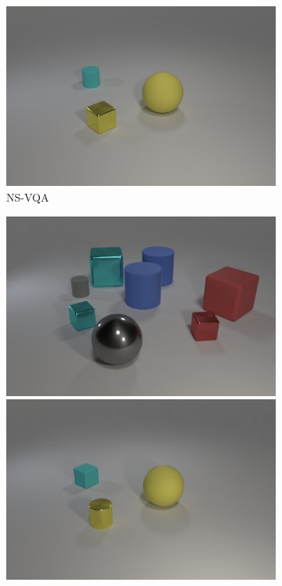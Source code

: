 \begin{figure}[t]
\begin{subfigure}{.32915\linewidth}
\includegraphics[width=\linewidth]{figures/clevr/ns-vqa/1.jpg}
\caption{NS-VQA}
\end{subfigure}
\hfill
\begin{subfigure}{.32915\linewidth}
\centering
\includegraphics[width=\linewidth]{figures/clevr/output/0.jpg}\\
\includegraphics[width=\linewidth]{figures/clevr/output/1.jpg}

\end{subfigure}
\end{figure}
